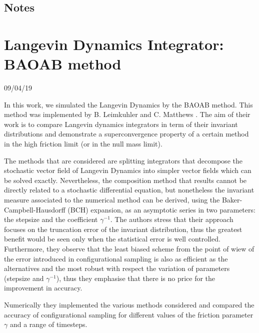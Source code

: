 \documentclass[10pt,a4paper]{article}
\begin{document}
  \begin{center}
   \section*{{\LARGE Notes}}
  \end{center}

\section{Langevin Dynamics Integrator: BAOAB method}
  \begin{center}
   {\small 09/04/19}
  \end{center}
In this work, we simulated the Langevin Dynamics by the BAOAB method. This method was implemented by B. Leimkuhler and C. Matthews \cite{LeimMatt:LAnDynInt}. The aim of their work is to compare Langevin dynamics integrators in term of their invariant distributions and demonstrate a superconvergence property of a certain method in the high friction limit (or in the null mass limit). 

The methods that are considered are splitting integrators that decompose the stochastic vector field of Langevin Dynamics into simpler vector fields which can be solved exactly. Nevertheless, the composition method that results cannot be directly related to a stochastic differential equation, but nonetheless the invariant measure associated to the numerical method can be derived, using the Baker-Campbell-Hausdorff (BCH) expansion, as an asymptotic series in two parameters: the stepsize and the coefficient $\gamma^{-1}$. The authors stress that their approach focuses on the truncation error of the invariant distribution, thus the greatest benefit would be seen only when the statistical error is well controlled. Furthermore, they observe that the least biased scheme from the point of wiew of the error introduced in configurational sampling is also as efficient as the alternatives and the most robust with respect the variation of parameters (stepsize and $\gamma^{-1}$), thus they emphasise that there is no price for the improvement in accuracy.

Numerically they implemented the various methods considered and compared the accuracy of configurational sampling for different values of the friction parameter $\gamma$ and a range of timesteps.
\end{document}
